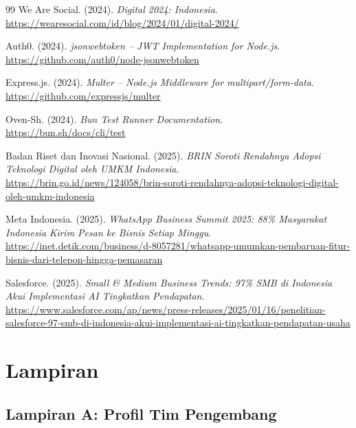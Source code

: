 \documentclass[12pt,a4paper,oneside]{article}
\begin{document}
\begin{thebibliography}{99}
	We Are Social. (2024). \textit{Digital 2024: Indonesia}. \\
	\url{https://wearesocial.com/id/blog/2024/01/digital-2024/}

	Auth0. (2024). \textit{jsonwebtoken -- JWT Implementation for Node.js}. \\
	\url{https://github.com/auth0/node-jsonwebtoken}

	Express.js. (2024). \textit{Multer -- Node.js Middleware for multipart/form-data}. \\
	\url{https://github.com/expressjs/multer}

	Oven-Sh. (2024). \textit{Bun Test Runner Documentation}. \\
	\url{https://bun.sh/docs/cli/test}

	Badan Riset dan Inovasi Nasional. (2025). \textit{BRIN Soroti Rendahnya Adopsi Teknologi Digital oleh UMKM Indonesia}. \\
	\url{https://brin.go.id/news/124058/brin-soroti-rendahnya-adopsi-teknologi-digital-oleh-umkm-indonesia}

	Meta Indonesia. (2025). \textit{WhatsApp Business Summit 2025: 88\% Masyarakat Indonesia Kirim Pesan ke Bisnis Setiap Minggu}. \\
	\url{https://inet.detik.com/business/d-8057281/whatsapp-umumkan-pembaruan-fitur-bisnis-dari-telepon-hingga-pemasaran}

	Salesforce. (2025). \textit{Small \& Medium Business Trends: 97\% SMB di Indonesia Akui Implementasi AI Tingkatkan Pendapatan}. \\
	\url{https://www.salesforce.com/ap/news/press-releases/2025/01/16/penelitian-salesforce-97-smb-di-indonesia-akui-implementasi-ai-tingkatkan-pendapatan-usaha}

\end{thebibliography}

\newpage
\section*{Lampiran}

\subsection*{Lampiran A: Profil Tim Pengembang}
\end{document}
